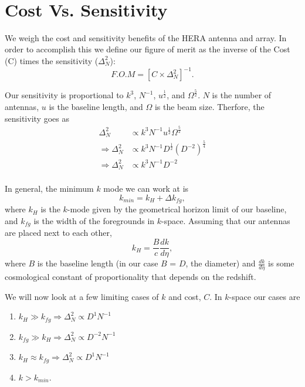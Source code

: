 \documentclass[11pt]{article}
\def\hf{\frac12}
\begin{document}
{ \\}
{
}
\vspace*{0.5cm}

\section{Cost Vs. Sensitivity}
    We weigh the cost and sensitivity benefits of the HERA antenna and array. 
In order to accomplish this we define our figure of merit as the inverse of the 
Cost (C) times the sensitivity ($\Delta_{N}^{2}$):
\begin{equation}
\label{eqn:fom}
    F.O.M = [C \times \Delta_{N}^{2}]^{-1}.
\end{equation}

Our sensitivity is proportional to $k^{3}$, $N^{-1}$, $u^{\frac{1}{2}}$, and $\Omega^{\frac{5}{2}}$. $N$ is the 
number of antennas, $u$ is the baseline length, and $\Omega$ is the beam size. Therfore, 
the sensitivity goes as
\begin{equation}
\begin{split}
    \Delta_{N}^{2} &\propto k^{3}N^{-1}u^{\frac{1}{2}} \Omega^{\frac{5}{2}} \\
    \Rightarrow \Delta_{N}^{2} &\propto k^{3}N^{-1} D^{\hf} (D^{-2})^{\frac{5}{4}} \\
    \Rightarrow \Delta_{N}^{2} &\propto k^{3}N^{-1} D^{-2}\\
\end{split}
\end{equation}

In general, the minimum $k$ mode we can work at is 
\begin{equation}
    k_{min} = k_{H} + \Delta{k_{fg}},
\end{equation}
where $k_{H}$ is the $k$-mode given by the geometrical horizon limit of our baseline, and $k_{fg}$ is 
the width of the foregrounds in $k$-space. Assuming that our antennas are placed next to each other, 
\begin{equation}
    k_{H} = \frac{B}{c}\frac{dk}{d\eta},
\end{equation}
where $B$ is the baseline length (in our case $B$ = $D$, the diameter) and $\frac{dk}{d\eta}$ is 
some cosmological constant of proportionality that depends on the redshift.

We will now look at a few limiting cases of $k$ and cost, $C$. In $k$-space our cases are 
\begin{enumerate}
    \item{$k_{H} \gg k_{fg} \Rightarrow \Delta_{N}^{2} \propto D^{1}N^{-1}$}
    \item{$k_{fg} \gg k_{H} \Rightarrow \Delta_{N}^{2} \propto D^{-2}N^{-1}$} 
    \item{$k_{H} \approx k_{fg} \Rightarrow \Delta_{N}^{2} \propto D^{1}N^{-1}$}
    \item{$k > k_{min}$.}
\end{enumerate}
\end{document}
